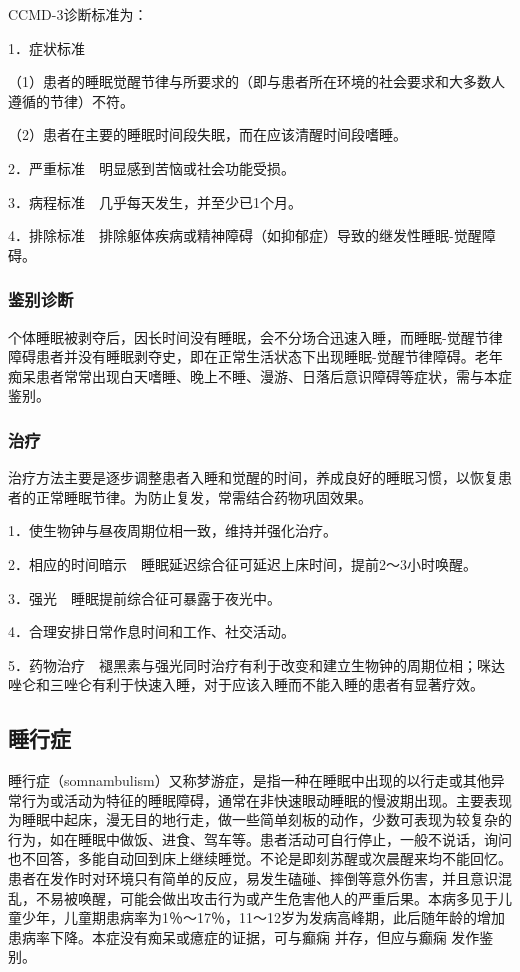 CCMD-3诊断标准为：

1．症状标准

（1）患者的睡眠觉醒节律与所要求的（即与患者所在环境的社会要求和大多数人遵循的节律）不符。

（2）患者在主要的睡眠时间段失眠，而在应该清醒时间段嗜睡。

2．严重标准　明显感到苦恼或社会功能受损。

3．病程标准　几乎每天发生，并至少已1个月。

4．排除标准　排除躯体疾病或精神障碍（如抑郁症）导致的继发性睡眠-觉醒障碍。

\subsubsection{鉴别诊断}

个体睡眠被剥夺后，因长时间没有睡眠，会不分场合迅速入睡，而睡眠-觉醒节律障碍患者并没有睡眠剥夺史，即在正常生活状态下出现睡眠-觉醒节律障碍。老年痴呆患者常常出现白天嗜睡、晚上不睡、漫游、日落后意识障碍等症状，需与本症鉴别。

\subsubsection{治疗}

治疗方法主要是逐步调整患者入睡和觉醒的时间，养成良好的睡眠习惯，以恢复患者的正常睡眠节律。为防止复发，常需结合药物巩固效果。

1．使生物钟与昼夜周期位相一致，维持并强化治疗。

2．相应的时间暗示　睡眠延迟综合征可延迟上床时间，提前2～3小时唤醒。

3．强光　睡眠提前综合征可暴露于夜光中。

4．合理安排日常作息时间和工作、社交活动。

5．药物治疗　褪黑素与强光同时治疗有利于改变和建立生物钟的周期位相；咪达唑仑和三唑仑有利于快速入睡，对于应该入睡而不能入睡的患者有显著疗效。

\subsection{睡行症}

睡行症（somnambulism）又称梦游症，是指一种在睡眠中出现的以行走或其他异常行为或活动为特征的睡眠障碍，通常在非快速眼动睡眠的慢波期出现。主要表现为睡眠中起床，漫无目的地行走，做一些简单刻板的动作，少数可表现为较复杂的行为，如在睡眠中做饭、进食、驾车等。患者活动可自行停止，一般不说话，询问也不回答，多能自动回到床上继续睡觉。不论是即刻苏醒或次晨醒来均不能回忆。患者在发作时对环境只有简单的反应，易发生磕碰、摔倒等意外伤害，并且意识混乱，不易被唤醒，可能会做出攻击行为或产生危害他人的严重后果。本病多见于儿童少年，儿童期患病率为1％～17％，11～12岁为发病高峰期，此后随年龄的增加患病率下降。本症没有痴呆或癔症的证据，可与癫痫
并存，但应与癫痫 发作鉴别。

